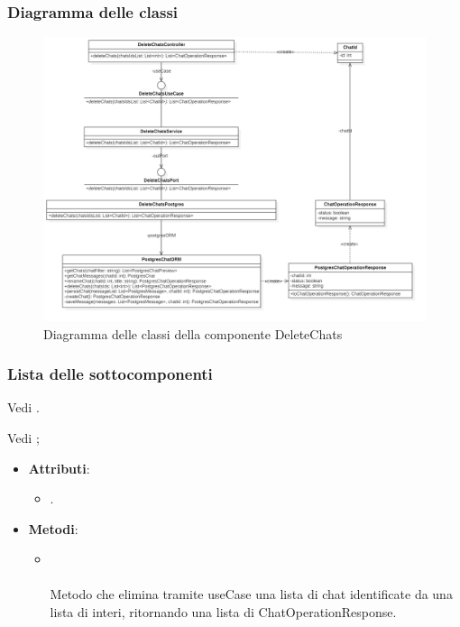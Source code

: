 \documentclass[10pt, a4paper]{article}
\begin{document}
\subsubsection{Diagramma delle classi}
\begin{figure}[H]
    \centering        
    \includegraphics[width=16.5cm]{img/DeleteChat.png}
    \caption{Diagramma delle classi della componente DeleteChats}
\end{figure}

\subsubsection{Lista delle sottocomponenti}

Vedi .

Vedi ;


\label{DeleteChatsControllerDettaglio}
\begin{itemize}
    \item \textbf{Attributi}:
    \begin{itemize}
        \item {}.
    \end{itemize}
    \item \textbf{Metodi}:
    \begin{itemize}
        \item {}\\ \\
        Metodo che elimina tramite useCase una lista di chat identificate da una lista di interi, ritornando una lista di ChatOperationResponse.
    
    \end{itemize}
\end{itemize}
\end{document}
